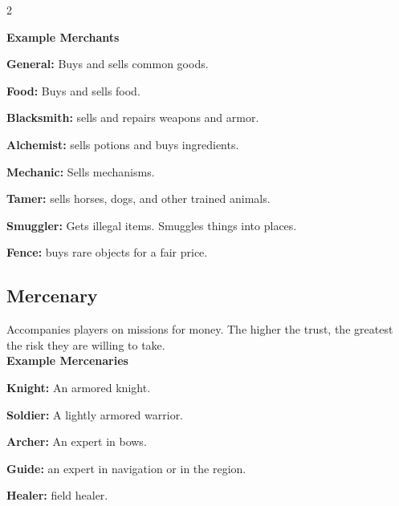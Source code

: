 \begin{multicols}{2}

\textbf{Example Merchants}


\begin{proplist}
    \item \textbf{General:} Buys and sells common goods. \\
    \item \textbf{Food:} Buys and sells food. \\
    \item \textbf{Blacksmith:} sells and repairs weapons and armor. \\
    \item \textbf{Alchemist:} sells potions and buys ingredients. \\
    \item \textbf{Mechanic:} Sells mechanisms. \\
    \item \textbf{Tamer:} sells horses, dogs, and other trained animals.\\
    \item \textbf{Smuggler:} Gets illegal items. Smuggles things into places.\\
    \item \textbf{Fence:} buys rare objects for a fair price.\\
\end{proplist}

\subsection{Mercenary} 
Accompanies players on missions for money. The higher the trust, the greatest the risk they are willing to take.  \\

\textbf{Example Mercenaries}
\begin{proplist}
    \item \textbf{Knight:} An armored knight.  \\
    \item \textbf{Soldier:} A lightly armored warrior.\\
    \item \textbf{Archer:} An expert in bows.\\
    \item \textbf{Guide:} an expert in navigation or in the region.\\
    \item \textbf{Healer:} field healer.\\
\end{proplist}


\end{multicols}
